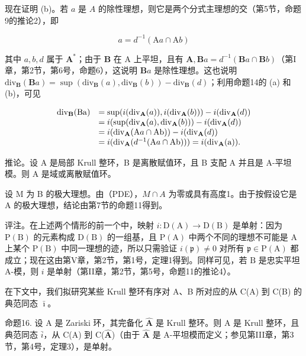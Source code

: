 现在证明 (b)。若 \(a\) 是 \(A\) 的除性理想，则它是两个分式主理想的交（第5节，命题9的推论2），即

\[
a = d ^ {- 1} (\mathrm{A} a \cap \mathrm{A} b)
\]

其中 \(a, b, d\) 属于 \(\mathbf{A}^*\)；由于 \(\mathbf{B}\) 在 A 上平坦，且有 \(\mathbf{A}, \mathbf{B}a = d^{-1}(\mathbf{B}a \cap \mathbf{B}b)\)（第I章，第2节，第6号，命题6），这说明 \(\mathbf{B}a\) 是除性理想。这也说明 \(\mathrm{div}_{\mathbf{B}}(\mathbf{B}a) = \sup (\mathrm{div}_{\mathbf{B}}(a), \mathrm{div}_{\mathbf{B}}(b)) - \mathrm{div}_{\mathbf{B}}(d)\)；利用命题14的 (a) 和 (b)，可见

\[
\begin{array}{r l} \operatorname{div} _ {\mathbf {B}} (\mathrm{Ba}) & = \sup (i (\operatorname{div} _ {\mathbf {A}} (a)), i (\operatorname{div} _ {\mathbf {A}} (b))) - i (\operatorname{div} _ {\mathbf {A}} (d)) \\ & = i (\sup (\operatorname{div} _ {\mathbf {A}} (a), \operatorname{div} _ {\mathbf {A}} (b))) - i (\operatorname{div} _ {\mathbf {A}} (d)) \\ & = i (\operatorname{div} _ {\mathbf {A}} (\mathrm{A} a \cap \mathrm{Ab})) - i (\operatorname{div} _ {\mathbf {A}} (d)) \\ & = i (\operatorname{div} _ {\mathbf {A}} (d ^ {- 1} (\mathrm{A} a \cap \mathrm{Ab}))) = i (\operatorname{div} _ {\mathbf {A}} (\mathrm{a})). \end{array}
\]

推论。设 A 是局部 Krull 整环，B 是离散赋值环，且 B 支配 A 并且是 A-平坦模。则 A 是域或离散赋值环。

设 M 为 B 的极大理想。由（PDE），\(M \cap A\) 为零或具有高度1。由于按假设它是 A 的极大理想，结论由第7节的命题11得到。

评注。在上述两个情形的前一个中，映射 \(i\colon\mathrm{D}(\mathrm{A})\to\mathrm{D}(\mathrm{B})\) 是单射：因为 \(\mathrm{P}(\mathrm{B})\) 的元素构成 \(\mathrm{D}(\mathrm{B})\) 的一组基，且 \(\mathrm{P}(\mathrm{A})\) 中两个不同的理想不可能是 \(\mathrm{A}\) 上某个 \(\mathrm{P}(\mathrm{B})\) 中同一理想的迹，所以只需验证 \(i(\mathfrak{p})\neq0\) 对所有 \(\mathfrak{p}\in\mathrm{P}(\mathrm{A})\) 都成立；现在这由第V章，第2节，第1号，定理1得到。同样可见，若 \(\mathrm{B}\) 是忠实平坦 A-模，则 \(i\) 是单射（第II章，第2节，第5号，命题11的推论4）。

在下文中，我们拟研究某些 Krull 整环有序对 A、B 所对应的从 C(A) 到 C(B) 的典范同态 \(\bar{\imath}\)。

命题16. 设 A 是 Zariski 环，其完备化 \(\hat{\mathbf{A}}\) 是 Krull 整环。则 A 是 Krull 整环，且典范同态 \(\bar{i}\)，从 C(A) 到 C(\(\hat{\mathbf{A}}\))（由于 \(\hat{\mathbf{A}}\) 是 A-平坦模而定义；参见第III章，第3节，第4号，定理3），是单射。

